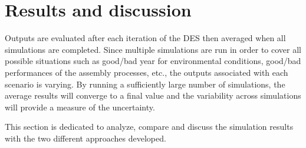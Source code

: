 \section{Results and discussion}
\label{results}
Outputs are evaluated after each iteration of the DES then averaged when all simulations are completed. Since multiple simulations are run in order to cover all possible situations such as good/bad year for environmental conditions, good/bad performances of the assembly processes, etc., the outputs associated with each scenario is varying. By running a sufficiently large number of simulations, the average results will converge to a final value and the variability across simulations will provide a measure of the uncertainty.

This section is dedicated to analyze, compare and discuss the simulation results with the two different approaches developed.